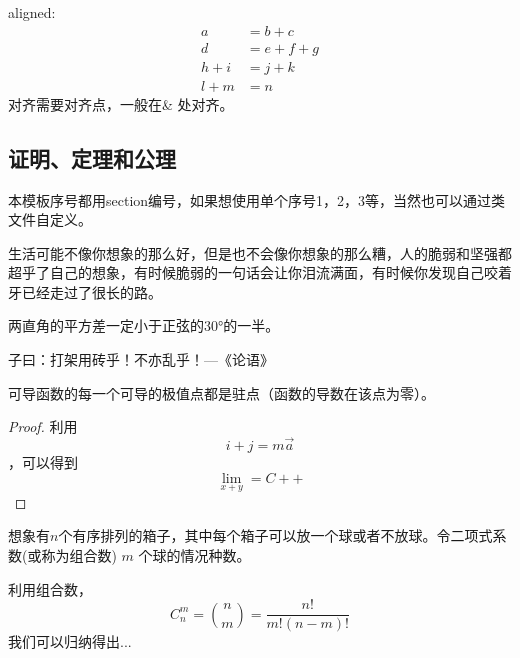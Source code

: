  aligned:
 \begin{equation}
 \begin{aligned}
 a&= b+ c\\
 d&= e+ f+g\\
 h+i&= j+k\\
 l+m&= n
 \end{aligned}
 \end{equation}
 对齐需要对齐点，一般在\& 处对齐。
 \subsection{证明、定理和公理}
 本模板序号都用section编号，如果想使用单个序号1，2，3等，当然也可以通过类文件自定义。
 \begin{corollary}
 生活可能不像你想象的那么好，但是也不会像你想象的那么糟，人的脆弱和坚强都超乎了自己的想象，有时候脆弱的一句话会让你泪流满面，有时候你发现自己咬着牙已经走过了很长的路。
 \end{corollary}
 \begin{theorem}[三角形的内积和]
  两直角的平方差一定小于正弦的30°的一半。
 \end{theorem}


\begin{exercise}
子曰：打架用砖乎！不亦乱乎！\hfill ---《论语》
\end{exercise}
\begin{lemma}
 可导函数的每一个可导的极值点都是驻点（函数的导数在该点为零）。
\end{lemma}

\begin{proof}
     利用\[i +j =m\overrightarrow{a}\]，可以得到\[\lim_{x+y} =C++\]
\end{proof}
 
\begin{example}
想象有$n$个有序排列的箱子，其中每个箱子可以放一个球或者不放球。令二项式系数(或称为组合数) 
$m$ 个球的情况种数。

\end{example}

\begin{solution}
    利用组合数，
    \[ 
      C^m_n= \binom{n}{m} = \frac{n!}{m!(n-m)!}
    \]
    我们可以归纳得出...
\end{solution}


 \clearpage
